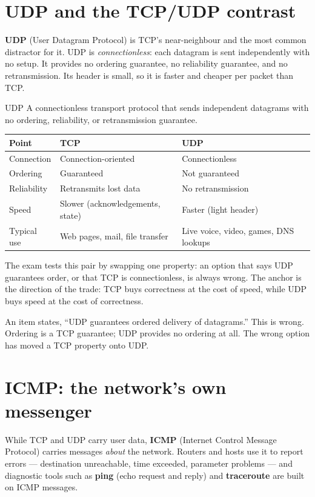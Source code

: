 \section{UDP and the TCP/UDP contrast}
\textbf{UDP} (User Datagram Protocol) is TCP's near-neighbour and the most
common distractor for it. UDP is \emph{connectionless}: each datagram is sent
independently with no setup. It provides no ordering guarantee, no
reliability guarantee, and no retransmission. Its header is small, so it is
faster and cheaper per packet than TCP.

\begin{definitionbox}{UDP}
A connectionless transport protocol that sends independent datagrams with no
ordering, reliability, or retransmission guarantee.
\end{definitionbox}

\begin{center}
\begin{tabular}{p{}p{}p{}}
\toprule
\textbf{Point} & \textbf{TCP} & \textbf{UDP} \\
\midrule
Connection & Connection-oriented & Connectionless \\
Ordering & Guaranteed & Not guaranteed \\
Reliability & Retransmits lost data & No retransmission \\
Speed & Slower (acknowledgements, state) & Faster (light header) \\
Typical use & Web pages, mail, file transfer & Live voice, video, games, DNS lookups \\
\bottomrule
\end{tabular}
\end{center}

The exam tests this pair by swapping one property: an option that says UDP
guarantees order, or that TCP is connectionless, is always wrong. The anchor
is the direction of the trade: TCP buys correctness at the cost of speed,
while UDP buys speed at the cost of correctness.

\begin{example}
An item states, ``UDP guarantees ordered delivery of datagrams.'' This is
wrong. Ordering is a TCP guarantee; UDP provides no ordering at all. The
wrong option has moved a TCP property onto UDP.
\end{example}

\section{ICMP: the network's own messenger}
While TCP and UDP carry user data, \textbf{ICMP} (Internet Control Message
Protocol) carries messages \emph{about} the network. Routers and hosts use it
to report errors --- destination unreachable, time exceeded, parameter
problems --- and diagnostic tools such as \textbf{ping} (echo request and
reply) and \textbf{traceroute} are built on ICMP messages.

